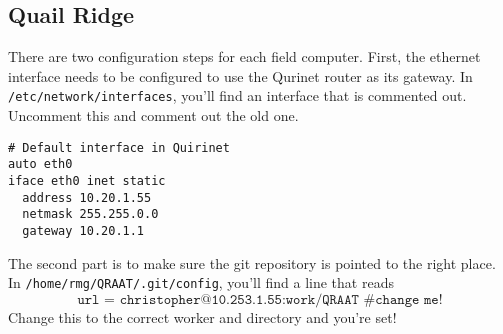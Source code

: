 \documentclass[letter]{article}
\begin{document}
\subsection{Quail Ridge}
There are two configuration steps for each field computer. First, the ethernet interface needs 
to be configured to use the Qurinet router as its gateway. In \texttt{/etc/network/interfaces}, 
you'll find an interface that is commented out. Uncomment this and comment out the old one. 
\begin{verbatim}
# Default interface in Quirinet
auto eth0 
iface eth0 inet static
  address 10.20.1.55
  netmask 255.255.0.0
  gateway 10.20.1.1
\end{verbatim}

The second part is to make sure the git repository is pointed to the right place. In 
\texttt{/home/rmg/QRAAT/.git/config}, you'll find a line that reads
$$ \texttt{url = christopher@10.253.1.55:work/QRAAT \# change me!} $$ 
Change this to the correct worker and directory and you're set!
\end{document}
